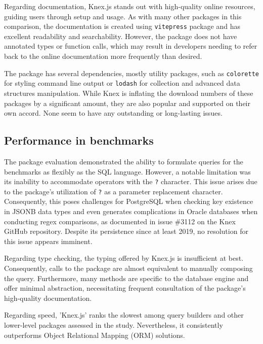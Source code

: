 Regarding documentation, Knex.js stands out with high-quality online resources,
guiding users through setup and usage. As with many other packages in this
comparison, the documentation is created using \texttt{vitepress} package and
has excellent readability and searchability. However, the package does not have
annotated types or function calls, which may result in developers needing to
refer back to the online documentation more frequently than desired.

The package has several dependencies, mostly utility packages, such as
\texttt{colorette} for styling command line output or \texttt{lodash} for
collection and advanced data structures manipulation. While Knex is inflating
the download numbers of these packages by a significant amount, they are also
popular and supported on their own accord. None seem to have any outstanding or
long-lasting issues.

\subsection*{Performance in benchmarks}

The package evaluation demonstrated the ability to formulate queries for the
benchmarks as flexibly as the SQL language. However, a notable limitation was
its inability to accommodate operators with the \texttt{?} character. This issue
arises due to the package's utilization of \texttt{?} as a parameter replacement
character. Consequently, this poses challenges for PostgreSQL when checking key
existence in JSONB data types and even generates complications in Oracle
databases when conducting regex comparisons, as documented in issue \#3112 on
the Knex GitHub repository. Despite its persistence since at least 2019, no
resolution for this issue appears imminent.

Regarding type checking, the typing offered by Knex.js is insufficient at best.
Consequently, calls to the package are almost equivalent to manually composing
the query. Furthermore, many methods are specific to the database engine and
offer minimal abstraction, necessitating frequent consultation of the package's
high-quality documentation.

Regarding speed, 'Knex.js' ranks the slowest among query builders and other
lower-level packages assessed in the study. Nevertheless, it consistently
outperforms Object Relational Mapping (ORM) solutions.
